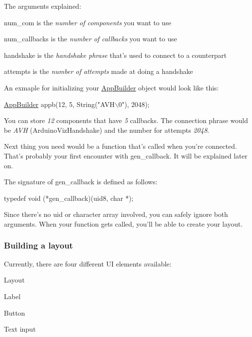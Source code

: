 The arguments explained\+:
\begin{DoxyItemize}
\item {\ttfamily num\+\_\+com} is the {\itshape number of components} you want to use
\item {\ttfamily num\+\_\+callbacks} is the {\itshape number of callbacks} you want to use
\item {\ttfamily handshake} is the {\itshape handshake phrase} that's used to connect to a counterpart
\item {\ttfamily attempts} is the {\itshape number of attempts} made at doing a handshake
\end{DoxyItemize}

An exmaple for initializing your \hyperlink{class_app_builder}{App\+Builder} object would look like this\+:


\begin{DoxyCode}
\hyperlink{class_app_builder}{AppBuilder} appb(12, 5, String(\textcolor{stringliteral}{"AVH\(\backslash\)0"}), 2048);
\end{DoxyCode}


You can store {\itshape 12} components that have {\itshape 5} callbacks. The connection phrase would be {\itshape A\+V\+H} (Arduino\+Viz\+Handshake) and the number for attempts {\itshape 2048}.

Next thing you need would be a function that's called when you're connected. That's probably your first encounter with {\ttfamily gen\+\_\+callback}. It will be explained later on.

The signature of {\ttfamily gen\+\_\+callback} is defined as follows\+: 
\begin{DoxyCode}
\textcolor{keyword}{typedef} void (*gen\_callback)(uid8, \textcolor{keywordtype}{char} *);
\end{DoxyCode}


Since there's no uid or character array involved, you can safely ignore both arguments. When your function gets called, you'll be able to create your layout.

\subsubsection*{Building a layout}

Currently, there are four different U\+I elements available\+:
\begin{DoxyItemize}
\item Layout
\item Label
\item Button
\item Text input
\end{DoxyItemize}

